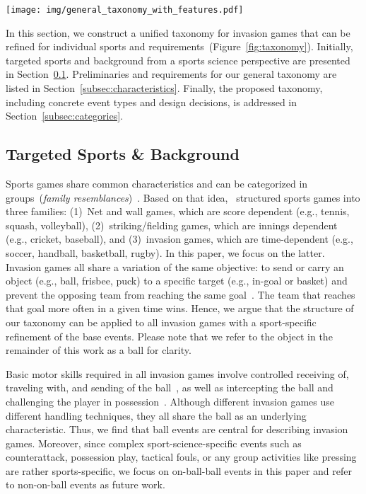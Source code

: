 \begin{figure*}[tbh]
	\centering
	\texttt{[image: img/general\_taxonomy\_with\_features.pdf]}
	\caption{Base taxonomy for invasion games and example refinements for soccer and handball. Starting with basic motoric \emph{individual ball events}, the finer the hierarchy level, the semantic and necessary context information increases.} 
	\label{fig:taxonomy}
\end{figure*}

In this section, we construct a unified taxonomy for invasion games that can be refined for individual sports and requirements~(Figure~\ref{fig:taxonomy}). 
Initially, targeted sports and background from a sports science perspective are presented in Section~\ref{subsec:sports}. Preliminaries and requirements for our general taxonomy are listed in Section~\ref{subsec:characteristics}.
Finally, the proposed taxonomy, including concrete event types and design decisions, is addressed in Section~\ref{subsec:categories}.

\subsection{Targeted Sports \& Background}\label{subsec:sports}
Sports games share common characteristics and can be categorized in groups~(\emph{family resemblances})~\cite{Wittgenstein1999}.
Based on that idea,~\cite{Read1997, Hughes2002} structured sports games into three families: (1)~Net and wall games, which are score dependent (e.g., tennis, squash, volleyball), (2)~striking/fielding games, which are innings dependent (e.g., cricket, baseball), and (3)~invasion games, which are time-dependent (e.g., soccer, handball, basketball, rugby). 
In this paper, we focus on the latter. 
Invasion games all share a variation of the same objective: to send or carry an object (e.g., ball, frisbee, puck) to a specific target (e.g., in-goal or basket) and prevent the opposing team from reaching the same goal~\cite{Read1997}. The team that reaches that goal more often in a given time wins. Hence, we argue that the structure of our taxonomy can be applied to all invasion games with a sport-specific refinement of the base events. Please note that we refer to the object in the remainder of this work as a ball for clarity. 

Basic motor skills required in all invasion games involve controlled receiving of, traveling with, and sending of the ball~\cite{Roth2015}, as well as intercepting the ball and challenging the player in possession~\cite{Read1997}. 
Although different invasion games use different handling techniques, they all share the ball as an underlying characteristic. 
Thus, we find that ball events are central for describing invasion games. Moreover, since complex sport-science-specific events such as counterattack, possession play, tactical fouls, or any group activities like pressing are rather sports-specific, we focus on on-ball-ball events in this paper and refer to non-on-ball events as future work.  

